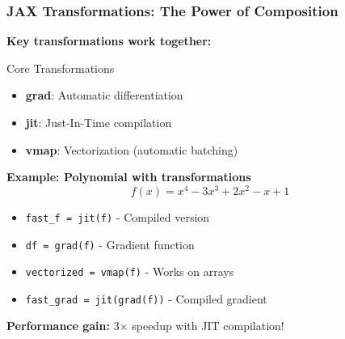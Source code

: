 \documentclass[notes]{beamer}
\begin{document}
\begin{frame}
\frametitle{JAX Transformations: The Power of Composition}

\textbf{Key transformations work together:}

\begin{block}{Core Transformations}
\begin{itemize}
    \item \textbf{grad}: Automatic differentiation
    \item \textbf{jit}: Just-In-Time compilation
    \item \textbf{vmap}: Vectorization (automatic batching)
\end{itemize}
\end{block}

\textbf{Example: Polynomial with transformations}
\begin{equation*}
f(x) = x^4 - 3x^3 + 2x^2 - x + 1
\end{equation*}

\begin{itemize}
    \item \texttt{fast\_f = jit(f)} - Compiled version
    \item \texttt{df = grad(f)} - Gradient function
    \item \texttt{vectorized = vmap(f)} - Works on arrays
    \item \texttt{fast\_grad = jit(grad(f))} - Compiled gradient
\end{itemize}

\textbf{Performance gain:} 3× speedup with JIT compilation!

\end{frame}
\end{document}
